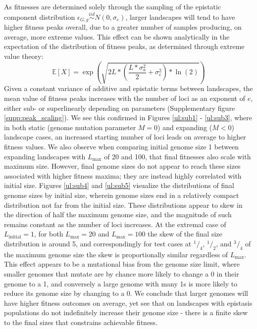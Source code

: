 \documentclass[paper=a4, fontsize=11pt,twoside]{scrartcl}       %
\begin{document}
As fitnesses are determined solely through the sampling of the epistatic component distribution $\epsilon_{G,g} \overset{iid}{\sim} N(0,\sigma_e)$, larger landscapes will tend to have higher fitness peaks overall, due to a greater number of samples producing, on average, more extreme values. This effect can be shown analytically in the expectation of the distribution of fitness peaks, as determined through extreme value theory:  $$\mathbb{E}[X] = \exp{\left(\sqrt{2L \ast (\frac{L \ast \sigma_a^2}{2} + \sigma_e^2) \ast \ln(2)}\right)}$$ Given a constant variance of additive and epistatic terms between landscapes, the mean value of fitness peaks increases with the number of loci as an exponent of $e$, either sub- or superlinearly depending on parameters (Supplementary figure \ref{supp:peak_scaling}). We see this confirmed in Figures \ref{ul:sub1} - \ref{ul:sub3}, where in both static (genome mutation parameter $M = 0$) and expanding ($M < 0$) landscape cases, an increased starting number of loci leads on average to higher fitness values. We also observe when comparing initial genome size 1 between expanding landscapes with $L_{\text{max}}$ of 20 and 100, that final fitnesses also scale with maximum size. However, final genome sizes do not appear to reach these sizes associated with higher fitness maxima; they are instead highly correlated with initial size. Figures \ref{ul:sub4} and \ref{ul:sub5} visualize the distributions of final genome sizes by initial size, wherein genome sizes end in a relatively compact distribution not far from the initial size. These distributions appear to skew in the direction of half the maximum genome size, and the magnitude of such remains constant as the number of loci increases. At the extremal case of $L_{\text{initial}} = 1$, for both $L_{\text{max}} = 20$ and $L_{\text{max}} = 100$ the skew of the final size distribution is around 5, and correspondingly for test cases at $^1/_4$, $^1/_2$, and $^3/_4$ of the maximum genome size the skew is proportionally similar regardless of $L_{\text{max}}$. This effect appears to be a mutational bias from the genome size limit, where smaller genomes that mutate are by chance more likely to change a 0 in their genome to a 1, and conversely a large genome with many 1s is more likely to reduce its genome size by changing to a 0. We conclude that larger genomes will have higher fitness outcomes on average, yet see that on landscapes with epistasis populations do not indefinitely increase their genome size - there is a finite skew to the final sizes that constrains achievable fitness.
\end{document}
